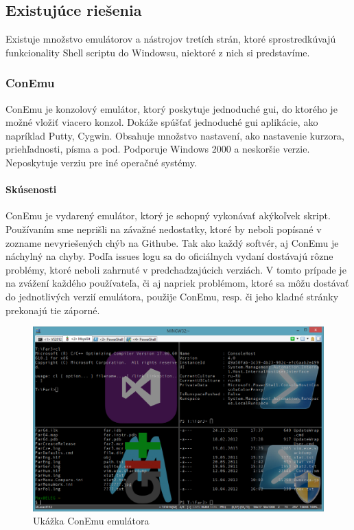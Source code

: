 \subsection{Existujúce riešenia}
\indent
Existuje množstvo emulátorov a nástrojov tretích strán, ktoré sprostredkúvajú funkcionality Shell scriptu do Windowsu, niektoré z nich si predstavíme.

\subsubsection{ConEmu}
\indent ConEmu je konzolový emulátor, ktorý poskytuje jednoduché \acrshort{gui}, do ktorého je možné vložiť viacero konzol. Dokáže spúšťať jednoduché \acrshort{gui} aplikácie, ako napríklad Putty, Cygwin. Obsahuje množstvo nastavení, ako nastavenie kurzora, priehľadnosti, písma a pod. Podporuje Windows 2000 a neskoršie verzie. Neposkytuje verziu pre iné operačné systémy. \cite{conemu}
\paragraph{Skúsenosti}
\indent ConEmu je vydarený emulátor, ktorý je schopný vykonávať akýkoľvek skript. Používaním sme neprišli na závažné nedostatky, ktoré by neboli popísané v zozname nevyriešených chýb na Githube. Tak ako každý softvér, aj ConEmu je náchylný na chyby. Podľa issues logu sa do oficiálnych vydaní dostávajú rôzne problémy, ktoré neboli zahrnuté v predchadzajúcich verziách. V tomto prípade je na zvážení každého používateľa, či aj napriek problémom, ktoré sa môžu dostávať do jednotlivých verzií emulátora, použije ConEmu, resp. či jeho kladné stránky prekonajú tie záporné.

\begin{figure}[H]
	\centering
	\includegraphics[scale=0.3]{img/conEmuImg.jpg}
	\caption{Ukážka ConEmu emulátora}
	\label{fig:test}
\end{figure}
\newpage
